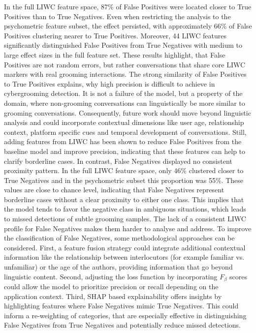 In the full LIWC feature space, 87\% of False Positives were located closer to True Positives than to True Negatives. Even when restricting the analysis to the psychometric feature subset, the effect persisted, with approximately 66\% of False Positives clustering nearer to True Positives. Moreover, 44 LIWC features significantly distinguished False Positives from True Negatives with medium to large effect sizes in the full feature set. These results highlight, that False Positives are not random errors, but rather conversations that share core LIWC markers with real grooming interactions. The strong similarity of False Positives to True Positives explains, why high precision is difficult to achieve in cybergrooming detection. It is not a failure of the model, but a property of the domain, where non-grooming conversations can linguistically be more similar to grooming conversations. Consequently, future work should move beyond linguistic analysis and could incorporate contextual dimensions like user age, relationship context, platform specific cues and temporal development of conversations. Still, adding features from LIWC has been shown to reduce False Positives from the baseline model and improve precision, indicating that these features can help to clarify borderline cases.
In contrast, False Negatives displayed no consistent proximity pattern. In the full LIWC feature space, only 46\% clustered closer to True Negatives and in the psychometric subset this proportion was 55\%. These values are close to chance level, indicating that False Negatives represent borderline cases without a clear proximity to either one class. This implies that the model tends to favor the negative class in ambiguous situations, which leads to missed detections of subtle grooming samples. The lack of a consistent LIWC profile for False Negatives makes them harder to analyse and address. To improve the classification of False Negatives, some methodological approaches can be considered. First, a feature fusion strategy could integrate additional contextual information like the relationship between interlocutors (for example familiar vs. unfamiliar) or the age of the authors, providing information that go beyond linguistic content. Second, adjusting the loss function by incorporating $F_{\beta}$ scores could allow the model to prioritize precision or recall depending on the application context. Third, SHAP based explainability offers insights by highlighting features where False Negatives mimic True Negatives. This could inform a re-weighting of categories, that are especially effective in distinguishing False Negatives from True Negatives and potentially reduce missed detections.  

